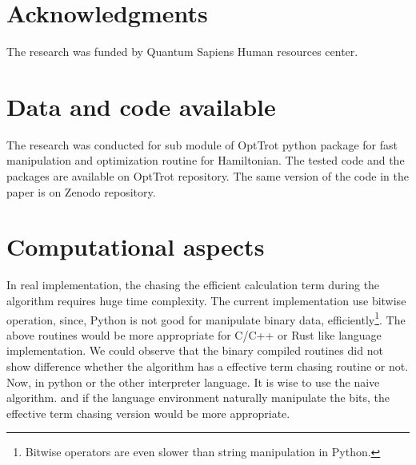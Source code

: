 \documentclass[twocolumn]{article}
\begin{document}
\section*{Acknowledgments}
The research was funded by Quantum Sapiens Human resources center.

\section*{Data and code available}
The research was conducted for sub module of OptTrot python package for 
fast manipulation and optimization routine for Hamiltonian.
The tested code and the packages are available on OptTrot repository.
The same version of the code in the paper is on 
Zenodo repository\cite{kim_2024_11048922}.
  
  

\appendix
%
%
%
%
%

\section{Computational aspects}
In real implementation, the chasing the efficient calculation term during 
the algorithm requires huge time complexity.
The current implementation use bitwise operation, since, Python is not good for 
manipulate binary data, efficiently\footnote{Bitwise operators are even slower than string manipulation in Python.}. 
The above routines would be more appropriate for C/C++ or Rust like language implementation.
We could observe that the binary compiled routines did not show difference 
whether the algorithm has a effective term chasing routine or not.
Now, in python or the other interpreter language. It is wise to use the naive algorithm.
and if the language environment naturally manipulate the bits, the effective term chasing version
would be more appropriate.

\end{document}
